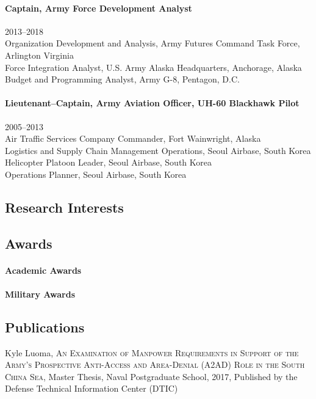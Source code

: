 \documentclass[12pt,letterpaper]{article}
\begin{document}
\paragraph{Captain, Army Force Development Analyst} 2013--2018\\
Organization Development and Analysis, Army Futures Command Task Force, Arlington Virginia\\
Force Integration Analyst, U.S. Army Alaska Headquarters, Anchorage, Alaska\\
Budget and Programming Analyst, Army G-8, Pentagon, D.C.
\paragraph{Lieutenant--Captain, Army Aviation Officer, UH-60 Blackhawk Pilot} 2005--2013\\
Air Traffic Services Company Commander, Fort Wainwright, Alaska\\
Logistics and Supply Chain Management Operations, Seoul Airbase, South Korea\\
Helicopter Platoon Leader, Seoul Airbase, South Korea\\
Operations Planner, Seoul Airbase, South Korea
\subsection{Research Interests}

\subsection{Awards}
\paragraph{Academic Awards\\}
\AcademicAwards
\paragraph{Military Awards\\}
\MilitaryAwards

\subsection{Publications}
Kyle Luoma, \textsc{An Examination of Manpower Requirements in Support of the Army's Prospective Anti-Access and Area-Denial (A2AD) Role in the South China Sea}, 
Master Thesis, Naval Postgraduate School, 2017, Published by the Defense Technical Information Center (DTIC)\par
\end{document}
